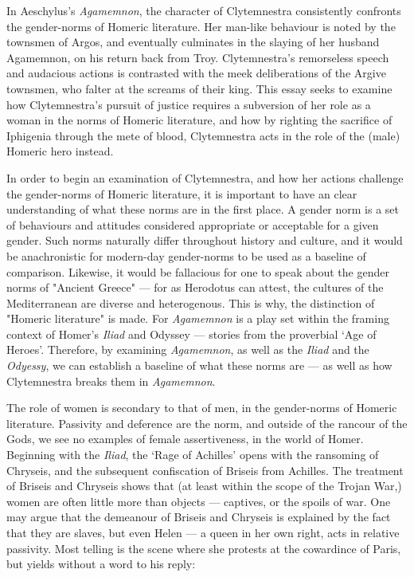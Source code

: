 In Aeschylus's \textit{Agamemnon}, the character of Clytemnestra consistently
confronts the gender-norms of Homeric literature. Her man-like behaviour is
noted by the townsmen of Argos, and eventually culminates in the slaying of
her husband Agamemnon, on his return back from Troy. Clytemnestra's
remorseless speech and audacious actions is contrasted with the meek
deliberations of the Argive townsmen, who falter at the screams of their king.
This essay seeks to examine how Clytemnestra's pursuit of justice requires a
subversion of her role as a woman in the norms of Homeric literature, and how
by righting the sacrifice of Iphigenia through the mete of blood, Clytemnestra
acts in the role of the (male) Homeric hero instead.

In order to begin an examination of Clytemnestra, and how her actions challenge
the gender-norms of Homeric literature, it is important to have an clear
understanding of what these norms are in the first place. A gender norm is a
set of behaviours and attitudes considered appropriate or acceptable for a given
gender. Such norms naturally differ throughout history and culture, and it
would be anachronistic for modern-day gender-norms to be used as a baseline
of comparison. Likewise, it would be fallacious for one to speak about the
gender norms of "Ancient Greece" --- for as Herodotus can attest, the cultures
of the Mediterranean are diverse and heterogenous. This is why, the distinction
of "Homeric literature" is made. For \textit{Agamemnon} is a play set within the
framing context of Homer's \textit{Iliad} and {Odyssey} --- stories from the
proverbial `Age of Heroes'. Therefore, by examining \textit{Agamemnon}, as well
as the \textit{Iliad} and the \textit{Odyessy}, we can establish a baseline of
what these norms are --- as well as how Clytemnestra breaks them in
\textit{Agamemnon}.

The role of women is secondary to that of men, in the gender-norms of Homeric
literature. Passivity and deference are the norm, and outside of the rancour
of the Gods, we see no examples of female assertiveness, in the world of Homer.
Beginning with the \textit{Iliad}, the `Rage of Achilles' opens
with the ransoming of Chryseis, and the subsequent confiscation of Briseis from
Achilles. The treatment of Briseis and Chryseis shows that (at least within the
scope of the Trojan War,) women are often little more than objects --- captives,
or the spoils of war. One may argue that the demeanour of Briseis and Chryseis
is explained by the fact that they are slaves, but even Helen --- a queen in her
own right, acts in relative passivity. Most telling is the scene where she
protests at the cowardince of Paris, but yields without a word to his reply:

